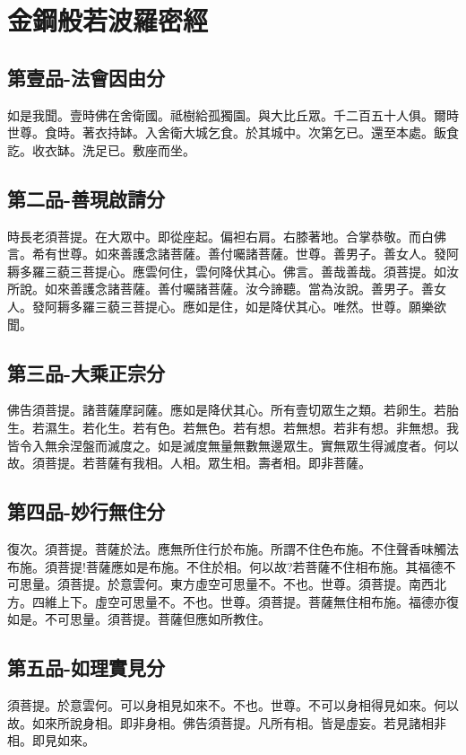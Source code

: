 \documentclass[a6paper, 22pt, twocolumn]{cvertbook}
\begin{document}
\inmain
\part[金鋼般若波羅密經]{金鋼般若波羅密經\hspace{3em}{\normalsize 姚秦三藏法師鳩摩羅什譯}}


\chapter{第壹品-法會因由分}
\large 如是我聞。壹時佛在舍衛國。祗樹給孤獨園。與大比丘眾。千二百五十人俱。爾時世尊。食時。著衣持缽。入舍衛大城乞食。於其城中。次第乞已。還至本處。飯食訖。收衣缽。洗足已。敷座而坐。
\chapter{第二品-善現啟請分}
\large 時長老須菩提。在大眾中。即從座起。偏袒右肩。右膝著地。合掌恭敬。而白佛言。希有世尊。如來善護念諸菩薩。善付囑諸菩薩。世尊。善男子。善女人。發阿耨多羅三藐三菩提心。應雲何住，雲何降伏其心。佛言。善哉善哉。須菩提。如汝所說。如來善護念諸菩薩。善付囑諸菩薩。汝今諦聽。當為汝說。善男子。善女人。發阿耨多羅三藐三菩提心。應如是住，如是降伏其心。唯然。世尊。願樂欲聞。
\chapter{第三品-大乘正宗分}
\large 佛告須菩提。諸菩薩摩訶薩。應如是降伏其心。所有壹切眾生之類。若卵生。若胎生。若濕生。若化生。若有色。若無色。若有想。若無想。若非有想。非無想。我皆令入無余涅盤而滅度之。如是滅度無量無數無邊眾生。實無眾生得滅度者。何以故。須菩提。若菩薩有我相。人相。眾生相。壽者相。即非菩薩。
\chapter{第四品-妙行無住分}
\large 復次。須菩提。菩薩於法。應無所住行於布施。所謂不住色布施。不住聲香味觸法布施。須菩提!菩薩應如是布施。不住於相。何以故?若菩薩不住相布施。其福德不可思量。須菩提。於意雲何。東方虛空可思量不。不也。世尊。須菩提。南西北方。四維上下。虛空可思量不。不也。世尊。須菩提。菩薩無住相布施。福德亦復如是。不可思量。須菩提。菩薩但應如所教住。
\chapter{第五品-如理實見分}
\large 須菩提。於意雲何。可以身相見如來不。不也。世尊。不可以身相得見如來。何以故。如來所說身相。即非身相。佛告須菩提。凡所有相。皆是虛妄。若見諸相非相。即見如來。
\end{document}
